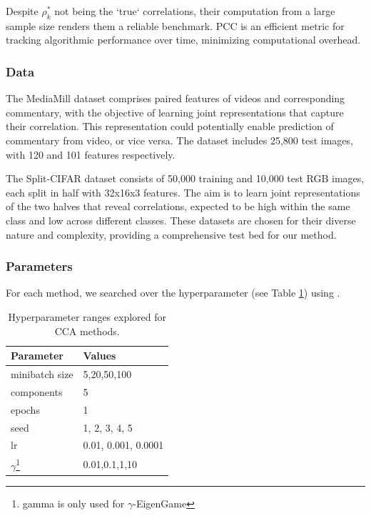Despite $\rho_k^*$ not being the `true` correlations, their computation from a large sample size renders them a reliable benchmark.
PCC is an efficient metric for tracking algorithmic performance over time, minimizing computational overhead\citep{meng2021online, gemp2022generalized, ma2015finding, ge2016efficient}.

\subsubsection{Data}
The MediaMill dataset \citep{gemert2008visual} comprises paired features of videos and corresponding commentary, with the objective of learning joint representations that capture their correlation.
This representation could potentially enable prediction of commentary from video, or vice versa.
The dataset includes 25,800 test images, with 120 and 101 features respectively.

The Split-CIFAR dataset \citep{meng2021online} consists of 50,000 training and 10,000 test RGB images, each split in half with 32x16x3 features.
The aim is to learn joint representations of the two halves that reveal correlations, expected to be high within the same class and low across different classes.
These datasets are chosen for their diverse nature and complexity, providing a comprehensive test bed for our method.

\subsubsection{Parameters} For each method, we searched over the hyperparameter (see Table \ref{tab:hyperparameters}) using \citet{wandb}.

\begin{table}[h!]
    \centering
    \begin{tabular}{|l|l|}
        \hline Parameter             & Values              \\
        \hline minibatch size        & 5,20,50,100         \\
        \hline components            & 5                   \\
        \hline epochs                & 1                   \\
        \hline seed                  & 1, 2, 3, 4, 5       \\
        \hline lr                    & 0.01, 0.001, 0.0001 \\
        \hline $\gamma$\footnote{gamma is only used for $\gamma$-EigenGame} & 0.01,0.1,1,10       \\
        \hline
    \end{tabular}
    \caption{Hyperparameter ranges explored for CCA methods.} 
    \label{tab:hyperparameters}
\end{table}

